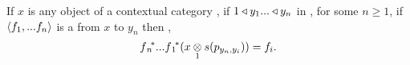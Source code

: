 \begin{lemma}
If $x$ is any object of a contextual category \catcw, if $1 \base y_1 ... \base y_n$ in \catc, for some $n \ge 1$, 
if $\tuple{\fn}$ is a  from $x$ to $y_n$ then \foreachi,
\begin{equation}
\fnvectorstar(\crossx{x}{s(p_{y_n,y_i})}{1})=f_i.                                    
\end{equation}
\end{lemma}